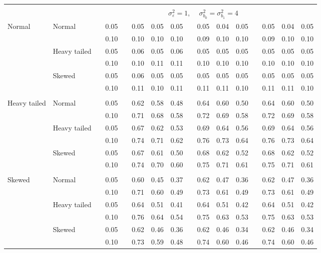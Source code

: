 \documentclass[12pt]{article} %
\begin{document}
\begin{table}[ht]
\begin{scriptsize}
\begin{center}
\begin{tabular}{ll p{.1cm} c p{.1cm} rrr p{.1cm} rrr p{.1cm} rrr}
&&&&&&&&&&&&&&&\\
& && && \multicolumn{9}{c}{$\sigma_{\varepsilon}^2 = 1$, \ \ $\sigma_{b_0}^2 = \sigma_{b_1}^2 = 4$} \\ \cline{6-16}
\rowcolor{gray!20}Normal       & Normal       && 0.05 &&   0.05 & 0.05 & 0.05 && 0.05 & 0.04 & 0.05 && 0.05 & 0.04 & 0.05 \\ 
\rowcolor{gray!20}             &              && 0.10 &&   0.10 & 0.10 & 0.10 && 0.09 & 0.10 & 0.10 && 0.09 & 0.10 & 0.10 \\ 
\rowcolor{gray!20}             & Heavy tailed && 0.05 &&   0.06 & 0.05 & 0.06 && 0.05 & 0.05 & 0.05 && 0.05 & 0.05 & 0.05 \\ 
\rowcolor{gray!20}             &              && 0.10 &&   0.10 & 0.11 & 0.11 && 0.10 & 0.10 & 0.10 && 0.10 & 0.10 & 0.10 \\ 
\rowcolor{gray!20}             & Skewed       && 0.05 &&   0.06 & 0.05 & 0.05 && 0.05 & 0.05 & 0.05 && 0.05 & 0.05 & 0.05 \\ 
\rowcolor{gray!20}             &              && 0.10 &&   0.11 & 0.10 & 0.11 && 0.11 & 0.11 & 0.10 && 0.11 & 0.11 & 0.10 \\ 
             &&&&&&&&&&&&&&&\\
Heavy tailed & Normal       && 0.05 &&   0.62 & 0.58 & 0.48 && 0.64 & 0.60 & 0.50 && 0.64 & 0.60 & 0.50 \\ 
             &              && 0.10 &&   0.71 & 0.68 & 0.58 && 0.72 & 0.69 & 0.58 && 0.72 & 0.69 & 0.58 \\ 
             & Heavy tailed && 0.05 &&   0.67 & 0.62 & 0.53 && 0.69 & 0.64 & 0.56 && 0.69 & 0.64 & 0.56 \\ 
             &              && 0.10 &&   0.74 & 0.71 & 0.62 && 0.76 & 0.73 & 0.64 && 0.76 & 0.73 & 0.64 \\ 
             & Skewed       && 0.05 &&   0.67 & 0.61 & 0.50 && 0.68 & 0.62 & 0.52 && 0.68 & 0.62 & 0.52 \\ 
             &              && 0.10 &&   0.74 & 0.70 & 0.60 && 0.75 & 0.71 & 0.61 && 0.75 & 0.71 & 0.61 \\ 
             &&&&&&&&&&&&&&&\\
Skewed       & Normal       && 0.05 &&   0.60 & 0.45 & 0.37 && 0.62 & 0.47 & 0.36 && 0.62 & 0.47 & 0.36 \\ 
             &              && 0.10 &&   0.71 & 0.60 & 0.49 && 0.73 & 0.61 & 0.49 && 0.73 & 0.61 & 0.49 \\ 
             & Heavy tailed && 0.05 &&   0.64 & 0.51 & 0.41 && 0.64 & 0.51 & 0.42 && 0.64 & 0.51 & 0.42 \\ 
             &              && 0.10 &&   0.76 & 0.64 & 0.54 && 0.75 & 0.63 & 0.53 && 0.75 & 0.63 & 0.53 \\ 
             & Skewed       && 0.05 &&   0.62 & 0.46 & 0.36 && 0.62 & 0.46 & 0.34 && 0.62 & 0.46 & 0.34 \\ 
             &              && 0.10 &&   0.73 & 0.59 & 0.48 && 0.74 & 0.60 & 0.46 && 0.74 & 0.60 & 0.46 \\ 


\end{tabular}
\end{center}
\end{scriptsize}
\end{table}
\end{document}
